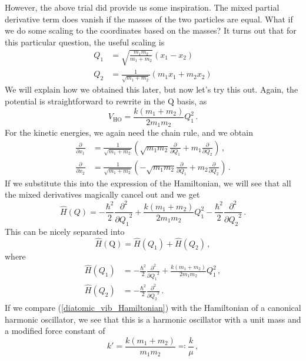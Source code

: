 \documentclass{article}
\theoremstyle{plain}\theoremheaderfont{\normalfont\itshape}\theorembodyfont{\rmfamily}\theoremseparator{.}\newtheorem*{rem}{Remark}\newtheorem*{ex}{Example}\newtheorem*{proof}{Proof}\newtheorem*{altp}{Alternative proof}
\theoremstyle{plain}\theoremheaderfont{\normalfont\bfseries}\theorembodyfont{\rmfamily}\theoremseparator{.}\newtheorem{thm}{Theorem}[section]\newtheorem{lem}[thm]{Lemma}\newtheorem{prop}[thm]{Proposition}\newtheorem*{cor}{Corollary}\newtheorem{defn}[thm]{Definition}\newtheorem{clm}[thm]{Claim}\newtheorem{clminproof}{Claim}
\theoremstyle{break}\theoremheaderfont{\normalfont\itshape}\theorembodyfont{\rmfamily}\theoremseparator{.\medskip}\newtheorem*{proofskip}{Proof}\newtheorem*{exs}{Examples}\newtheorem*{rems}{Remarks}
\theoremstyle{break}\theoremheaderfont{\normalfont\bfseries}\theorembodyfont{\rmfamily}\theoremseparator{.\medskip}\newtheorem{lemskip}[thm]{Lemma}\newtheorem{defnskip}[thm]{Definition}\newtheorem{propskip}[thm]{Proposition}\newtheorem{thmskip}[thm]{Theorem}
\numberwithin{equation}{section}
\newcommand{\pdv}[3][]{\frac{\partial^{#1} #2}{{\partial #3}^{#1}}}
\newcommand{\vb}[1]{\bm{\mathrm{#1}}}
\begin{document}
    However, the above trial did provide us some inspiration. The mixed partial derivative term does vanish if the masses of the two particles are equal. What if we do some scaling to the coordinates based on the masses? It turns out that for this particular question, the useful scaling is
    \begin{align}
        Q_1&=\sqrt{\frac{m_1m_2}{m_1+m_2}}(x_1-x_2)\\
        Q_2&=\frac{1}{\sqrt{m_1+m_2}}(m_1x_1+m_2x_2)
    \end{align}
    We will explain how we obtained this later, but now let's try this out. Again, the potential is straightforward to rewrite in the \(\vb{Q}\) basis, as
    \begin{equation}
        V_{\text{HO}}=\frac{k(m_1+m_2)}{2m_1m_2}Q_1^2\,.
    \end{equation}
    For the kinetic energies, we again need the chain rule, and we obtain
    \begin{align}
        \pdv{}{x_1}&=\frac{1}{\sqrt{m_1+m_2}}\left(\sqrt{m_1m_2}\pdv{}{Q_1}+m_1\pdv{}{Q_2}\right)\,,\\
        \pdv{}{x_2}&=\frac{1}{\sqrt{m_1+m_2}}\left(-\sqrt{m_1m_2}\pdv{}{Q_1}+m_2\pdv{}{Q_2}\right)\,.
    \end{align}
    If we substitute this into the expression of the Hamiltonian, we will see that all the mixed derivatives magically cancel out and we get
    \begin{equation}
        \hat{H}(Q)=-\frac{\hbar^2}{2}\pdv[2]{}{Q_1}+\frac{k(m_1+m_2)}{2m_1m_2}Q_1^2-\frac{\hbar^2}{2}\pdv[2]{}{Q_2}\,.
    \end{equation}
    This can be nicely separated into
    \begin{equation}
        \hat{H}(\vb{Q})=\hat{H}(Q_1)+\hat{H}(Q_2)\,,
    \end{equation}
    where
    \begin{align}
        \hat{H}(Q_1)&=-\frac{\hbar^2}{2}\pdv[2]{}{Q_1}+\frac{k(m_1+m_2)}{2m_1m_2}Q_1^2\,,\label{diatomic_vib_Hamiltonian}\\
        \hat{H}(Q_2)&=-\frac{\hbar^2}{2}\pdv[2]{}{Q_2}\,.\label{diatomic_trans_Hamiltonian}
    \end{align}
    If we compare (\ref{diatomic_vib_Hamiltonian}) with the Hamiltonian of a canonical harmonic oscillator, we see that this is a harmonic oscillator with a unit mass and a modified force constant of
    \begin{equation}
        k'=\frac{k(m_1+m_2)}{m_1m_2}\eqqcolon\frac{k}{\mu}\,,
    \end{equation}
\end{document}

